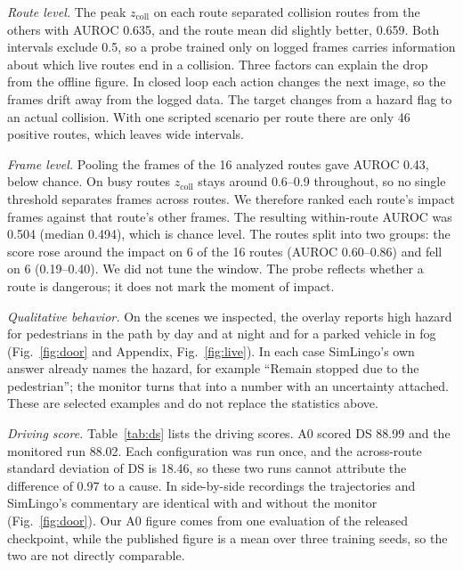 \documentclass[conference]{IEEEtran}
\newcommand{\zcoll}{z_{\mathrm{coll}}}
\begin{document}
\emph{Route level.} The peak $\zcoll$ on each route separated collision routes from
the others with AUROC 0.635, and the route mean did slightly better, 0.659. Both
intervals exclude 0.5, so a probe trained only on logged frames carries information
about which live routes end in a collision. Three factors can explain the drop from
the offline figure. In closed loop each action changes the next image, so the frames
drift away from the logged data. The target changes from a hazard flag to an actual
collision. With one scripted scenario per route there are only 46 positive routes,
which leaves wide intervals.

\emph{Frame level.} Pooling the frames of the 16 analyzed routes gave AUROC 0.43,
below chance. On busy routes $\zcoll$ stays around 0.6--0.9 throughout, so no single
threshold separates frames across routes. We therefore ranked each route's impact
frames against that route's other frames. The resulting within-route AUROC was 0.504
(median 0.494), which is chance level. The routes split into two groups: the score
rose around the impact on 6 of the 16 routes (AUROC 0.60--0.86) and fell on 6
(0.19--0.40). We did not tune the window. The probe reflects whether a route is
dangerous; it does not mark the moment of impact.

\emph{Qualitative behavior.} On the scenes we inspected, the overlay reports high
hazard for pedestrians in the path by day and at night and for a parked vehicle in
fog (Fig.~\ref{fig:door} and Appendix, Fig.~\ref{fig:live}). In each case SimLingo's
own answer already names the hazard, for example ``Remain stopped due to the
pedestrian''; the monitor turns that into a number with an uncertainty attached.
These are selected examples and do not replace the statistics above.

\emph{Driving score.} Table~\ref{tab:ds} lists the driving scores. A0 scored DS
88.99 and the monitored run 88.02. Each configuration was run once, and the
across-route standard deviation of DS is 18.46, so these two runs cannot attribute
the difference of 0.97 to a cause. In side-by-side recordings the trajectories and
SimLingo's commentary are identical with and without the monitor
(Fig.~\ref{fig:door}). Our A0 figure comes from one evaluation of the released
checkpoint, while the published figure is a mean over three training seeds, so the
two are not directly comparable.
\end{document}
